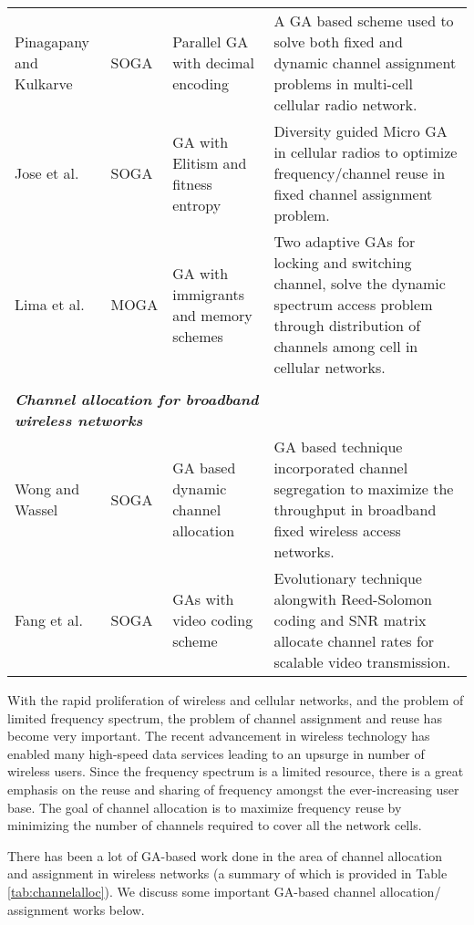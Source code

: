 \documentclass[journal]{IEEEtran}
\begin{document}
\begin{table*}
\begin{tabular}{p{2.5cm} p{1cm}p{3cm}p{10cm}}
Pinagapany and Kulkarve \cite{pinagapany2008solving}  & SOGA & Parallel GA with decimal encoding  &  A GA based scheme used to solve both fixed and dynamic channel assignment problems in multi-cell cellular radio network.\\ 

Jose et al. \cite{jose2007new}  &  SOGA & GA with Elitism and fitness entropy &  Diversity guided Micro GA in cellular radios to optimize frequency/channel reuse in fixed channel assignment problem.\\

Lima et al. \cite{lima2007adaptive}  &  MOGA  & GA with immigrants and memory schemes &  Two adaptive GAs for locking and switching channel, solve the dynamic spectrum access problem through distribution of channels among cell in cellular networks.\\ 

\\
\multicolumn{3}{l}{\textbf{\emph{Channel allocation for broadband wireless networks}}} \\
Wong and Wassel \cite{wong2002dynamic}  & SOGA & GA based dynamic channel allocation &  GA based technique incorporated channel segregation to maximize the throughput in broadband fixed wireless access networks.\\

Fang et al. \cite{fang2006gop}  & SOGA & GAs with video coding scheme &  Evolutionary technique alongwith Reed-Solomon coding and SNR matrix allocate channel rates for scalable video transmission.\\

\bottomrule
\end{tabular}
\label{tab:channelalloc}
\end{table*}

With the rapid proliferation of wireless and cellular networks, and the problem of limited frequency spectrum, the problem of channel assignment and reuse has become very important. The recent advancement in wireless technology has enabled many high-speed data services leading to an upsurge in number of wireless users. Since the frequency spectrum is a limited resource, there is a great emphasis on the reuse and sharing of frequency amongst the ever-increasing user base. The goal of channel allocation is to maximize frequency reuse by minimizing the number of channels required to cover all the network cells. 

There has been a lot of GA-based work done in the area of channel allocation and assignment in wireless networks (a summary of which is provided in Table \ref{tab:channelalloc}). We discuss some important GA-based channel allocation/ assignment works below.
\end{document}
